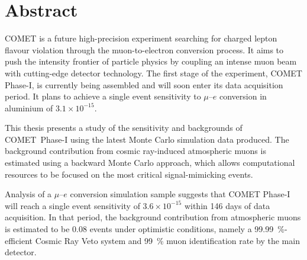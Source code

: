 \chapter*{Abstract}


COMET is a future high-precision experiment searching for charged lepton flavour
violation through the muon-to-electron conversion process. It aims to push the
intensity frontier of particle physics by coupling an intense muon beam with
cutting-edge detector technology. The first stage of the experiment, COMET
Phase\nobreakdash-I, is currently being assembled and will soon enter its data acquisition
period. It plans to achieve a single event sensitivity to $\mu$--$e$ conversion
in aluminium of $3.1 \times 10^{-15}$.

This thesis presents a study of the sensitivity and backgrounds of \mbox{COMET
Phase\nobreakdash-I} using the latest Monte Carlo simulation data produced. The background
contribution from cosmic ray-induced atmospheric muons is estimated using a
backward Monte Carlo approach, which allows computational resources to be
focused on the most critical signal-mimicking events.

Analysis of a $\mu$--$e$ conversion simulation sample suggests that COMET
Phase\nobreakdash-I will reach a single event sensitivity of $3.6 \times 10^{-15}$ within 146
days of data acquisition. In that period, the background contribution from
atmospheric muons is estimated to be 0.08 events under optimistic conditions,
namely a \SI{99.99}{\percent}-efficient Cosmic Ray Veto system and
\SI{99}{\percent} muon identification rate by the main detector.